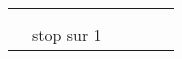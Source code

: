 \begin{tabular}{RC|C|C|CD}
	                                                                                                      \\
	                                                                                                      \\

	                    & stop sur 1                                                                                                             \\
\end{tabular}
